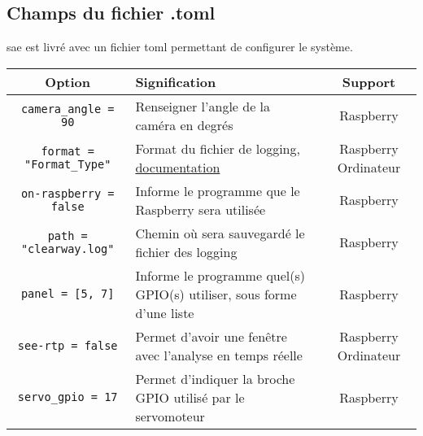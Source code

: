 \subsection{Champs du fichier .toml}
\label{sec:executionTOML_clearWay}
\gls{sae} est livré avec un fichier toml permettant de configurer le système.
\begin{table}[H]
    \centering
    \begin{tabularx}{\linewidth}{|c|X|c|}
        \hline
        \rowcolor{tableColorDark} Option & Signification & Support   \\
        \hline
        \texttt{camera\_angle = 90}                  & Renseigner l'angle de la caméra en degrés                                                                                                                         & Raspberry               \\\hline
        \texttt{format = "Format\_Type"}             & Format du fichier de logging, \href{https://docs.python.org/3/howto/logging-cookbook.html\#formatting-styles}{documentation}                                      & Raspberry Ordinateur    \\\hline
        \texttt{on-raspberry = false}                & Informe le programme que le Raspberry sera utilisée                                                                                                               & Raspberry               \\\hline
        \texttt{path = "clearway.log"}               & Chemin où sera sauvegardé le fichier des logging                                                                                                                  & Raspberry               \\\hline
        \texttt{panel = [5, 7]}                      & Informe le programme quel(s) GPIO(s) utiliser, sous forme d'une liste                                                                                             & Raspberry               \\\hline
        \texttt{see-rtp = false}                     & Permet d'avoir une fenêtre avec l'analyse en temps réelle                                                                                                         & Raspberry Ordinateur    \\\hline
        \texttt{servo\_gpio = 17}                    & Permet d'indiquer la broche GPIO utilisé par le servomoteur                                                                                                       & Raspberry               \\\hline        

\end{tabularx}
\end{table}
